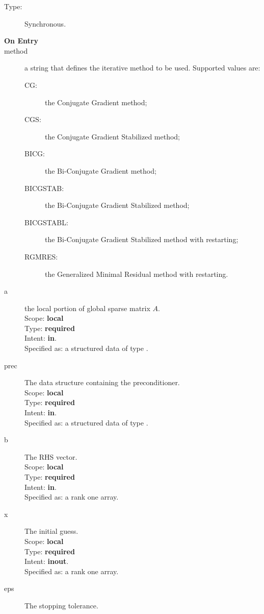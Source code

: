 \begin{description}
\item[Type:] Synchronous.
\item[\bf On Entry]
\item[method] a string that defines the iterative method to be
  used. Supported values are:
  \begin{description}
  \item[CG:] the Conjugate Gradient method;
  \item[CGS:] the Conjugate Gradient Stabilized method;

  \item[BICG:] the Bi-Conjugate Gradient method;
  \item[BICGSTAB:] the Bi-Conjugate Gradient Stabilized method;
  \item[BICGSTABL:] the Bi-Conjugate Gradient Stabilized method with restarting;
  \item[RGMRES:] the Generalized Minimal Residual method with restarting.
  \end{description}
\item[a] the local portion of global sparse matrix
$A$. \\
Scope: {\bf local} \\
Type: {\bf required}\\
Intent: {\bf in}.\\
Specified as: a structured data of type \spdata.
\item[prec] The data structure containing the preconditioner.\\
Scope: {\bf local} \\
Type: {\bf required}\\
Intent: {\bf in}.\\
Specified as: a structured data of type \precdata.
\item[b] The RHS vector. \\
Scope: {\bf local} \\
Type: {\bf required}\\
Intent: {\bf in}.\\
Specified as: a rank one array.
\item[x] The initial guess. \\
Scope: {\bf local} \\
Type: {\bf required}\\
Intent: {\bf inout}.\\
Specified as: a rank one array.
\item[eps] The stopping tolerance. \\

\end{description}
